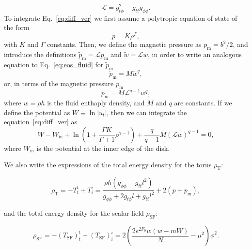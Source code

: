 \documentclass[twocolumn,aps,showpacs,showkeys,prd,superscriptaddress,byrevtex, amsmath]{revtex4-1}
\begin{document}
\begin{equation}\label{eq:l}
\mathcal{L} = g_{t\phi}^2 - g_{tt}g_{\phi\phi}.
\end{equation}
To integrate Eq.~\eqref{eq:diff_ver} we first assume a polytropic equation of state of the form
\begin{equation}\label{eq:eos_fluid}
p = K \rho^{\Gamma},
\end{equation}
with $K$ and $\Gamma$ constants.
Then, we define the magnetic pressure as $p_{\mathrm{m}} = b^2/2$, and introduce the definitions $\tilde{p}_{\mathrm{m}} = \mathcal{L} p_{\mathrm{m}}$ and $\tilde{w} = \mathcal{L} w$, in order to write an analogous equation to Eq.~\eqref{eq:eos_fluid} for $\tilde{p}_{\mathrm{m}}$~\citep{Komissarov:2006}
\begin{equation}\label{eq:eos_mag_tilde}
\tilde{p}_{\mathrm{m}} = M \tilde{w}^q,
\end{equation}
or, in terms of the magnetic pressure $p_{\mathrm{m}}$
\begin{equation}\label{eq:eos_mag}
p_{\mathrm{m}} = M \mathcal{L}^{q-1} w^q,
\end{equation}
where $w = \rho h$ is the fluid enthaply density, and $M$ and $q$ are constants.
If we define the potential as $W \equiv \ln |u_t|$, then we can integrate the equation~\eqref{eq:diff_ver} as
\begin{equation}\label{eq:final}
W - W_{\mathrm{in}} + \ln \left(1 + \frac{\Gamma K}{\Gamma +1}\rho^{\gamma -1}\right) + \frac{q}{q-1}M(\mathcal{L}w)^{q-1}=0,
\end{equation}
where $W_{\mathrm{in}}$ is the potential at the inner edge of the disk.

We also write the expressions of the total energy density for the torus $\rho_{\mathrm{T}}$:

\begin{equation}\label{eq:torus_energy_density}
\rho_{\mathrm{T}} = -T^t_t + T^i_i = \frac{\rho h (g_{\phi\phi} - g_{tt} l^2)}{g_{\phi\phi} + 2 g_{t\phi} l + g_{tt} l^2} + 2 (p + p_{\mathrm{m}}),
\end{equation}

and the total energy density for the scalar field $\rho_{\mathrm{SF}}$:

\begin{equation}\label{eq:SF_energy_density}
\rho_{\mathrm{SF}} = -(T_{\mathrm{SF}})^t_t + (T_{\mathrm{SF}})^i_i = 2 \left(\frac{2 e^{2 F_0} w (w-m W)}{N} - \mu^2\right) \phi^2.
\end{equation}
\end{document}
